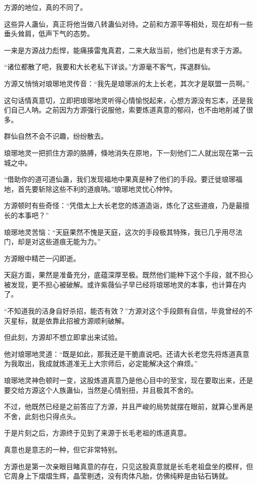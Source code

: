 \begin{this_body}
方源的地位，真的不同了。

这些异人蛊仙，真正将他当做八转蛊仙对待。之前和方源平等相处，现在却有一些垂头耸肩，低声下气的态势。

一来是方源战力彪悍，能痛揍雷鬼真君，二来大敌当前，他们也是有求于方源。

“诸位都散了吧，我要和大长老私下详谈。”方源毫不客气，挥退群仙。

方源又悄悄对琅琊地灵传音：“我先是琅琊派的太上长老，其次才是联盟一员啊。”

这句话情真意切，立即把琅琊地灵听得心情愉悦起来，心想方源没有忘本，还是我们自己人呐。之前因为方源强行说服他，索要炼道真意的郁闷，也不由地削减了很多。

群仙自然不会不识趣，纷纷散去。

琅琊地灵一把抓住方源的胳膊，倏地消失在原地，下一刻他们二人就出现在第一云城之中。

“借助你的道可道仙蛊，我们发现福地中果真是种了他们的手段。要迁徙琅琊福地，首先要斩除这些不利的道痕呐。”琅琊地灵忧心忡忡。

方源顿时有些奇怪：“凭借太上大长老您的炼道造诣，炼化了这些道痕，乃是最擅长的本事吧？”

琅琊地灵苦恼：“天庭果然不愧是天庭，这次的手段极其特殊，我已几乎用尽法门，却是对这些道痕无能为力。”

方源眼中精芒一闪即逝。

天庭方面，果然是准备充分，底蕴深厚至极。既然他们能种下这个手段，就不担心被发现，更不担心被破解。或许紫薇仙子早已经将琅琊地灵的本事，也计算在内了。

“不知道我的洁身自好杀招，能否有效？”方源对这个手段颇有自信，毕竟曾经的不灭星标，就是依靠此招被方源顺利破解。

但此刻，方源却不想立即拿出来试验。

他对琅琊地灵道：“既是如此，那我还是干脆直说吧。还请大长老您先将炼道真意为我取出，我成就炼道准无上大宗师后，必定能解决这个麻烦。”

琅琊地灵神色顿时一变，这股炼道真意乃是他心目中的至宝，现在要取出来，还是要交给方源这个人族蛊仙，当然是心情别扭，并且极其不舍的。

不过，他既然已经是之前答应了方源，并且严峻的局势就摆在眼前，就算心里再是不舍，此刻也只得点头。

于是片刻之后，方源终于见到了来源于长毛老祖的炼道真意。

真意也是意志的一种，但它非常特别。

方源也是第一次亲眼目睹真意的存在，只见这股真意就是长毛老祖盘坐的模样，但它周身上下熠熠生辉，晶莹剔透，没有肉体凡胎，仿佛纯粹是由钻石铸就。


\end{this_body}
